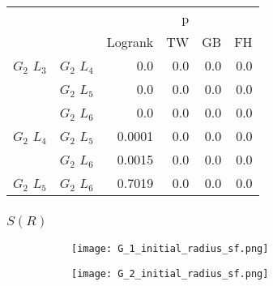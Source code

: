       \begin{table}[h!]
        \centering
        \begin{tabular}{llrrrr}
          \toprule
                       &             &         &  p &    &     \\
          \cmidrule{3-6}
                       &             & Logrank & TW & GB & FH  \\
          \midrule
          $G_2$ $L_3$  & $G_2$ $L_4$  &  0.0 &  0.0 &  0.0 &  0.0     \\
                       & $G_2$ $L_5$  & 0.0 & 0.0 & 0.0 & 0.0    \\
                       & $G_2$ $L_6$  & 0.0 & 0.0 & 0.0 & 0.0      \\
          $G_2$ $L_4$  & $G_2$ $L_5$  & 0.0001 & 0.0 & 0.0 & 0.0      \\
                       & $G_2$ $L_6$  & 0.0015 & 0.0 & 0.0 & 0.0       \\
          $G_2$ $L_5$   & $G_2$ $L_6$ & 0.7019 &  0.0 & 0.0 & 0.0      \\
          \bottomrule
        \end{tabular}
        \label{tab:g2_ingroup_tests_disp}
        \caption{}
      \end{table}




      

      

      \subsubsection{$S(R)$}
      
      \begin{figure}[h!]
        \centering
        
        \begin{subfigure}[b]{0.45\textwidth}
          \texttt{[image: G\_1\_initial\_radius\_sf.png]}
          \caption{}
          \label{fig:sf_g1_branch_radius}
        \end{subfigure}
        \hfill
        \begin{subfigure}[b]{0.45\textwidth}
          \texttt{[image: G\_2\_initial\_radius\_sf.png]}
          \caption{}
          \label{fig:sf_g2_branch_radius}
        \end{subfigure}

        \caption{}
        \label{fig:sf_branch_radius}

      \end{figure}

